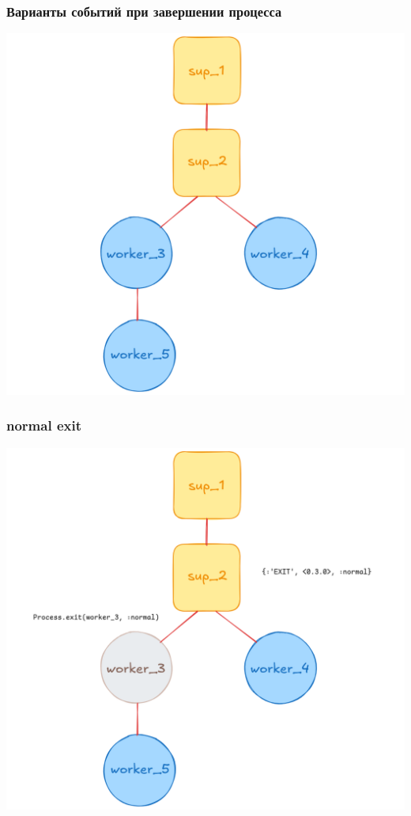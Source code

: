 \documentclass[10pt]{beamer}
\begin{document}
\begin{frame}
  \frametitle{Варианты событий при завершении процесса}
  \center
  \includegraphics[scale=0.2]{link_exit_1}
\end{frame}

\begin{frame}
  \frametitle{normal exit}
  \center
  \includegraphics[scale=0.2]{link_exit_2}
\end{frame}
\end{document}
